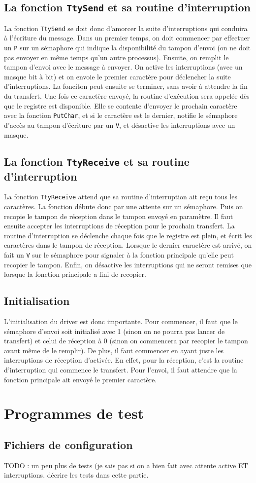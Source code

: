 \documentclass{article}
\def\fun#1{\texttt{#1}}
\begin{document}
\subsection{La fonction \fun{TtySend} et sa routine d'interruption}
La fonction \fun{TtySend} se doit donc d'amorcer la suite d'interruptions qui conduira à l'écriture du message. Dans un premier temps, on doit commencer par effectuer un \fun{P} sur un sémaphore qui indique la disponibilité du tampon d'envoi (on ne doit pas envoyer en même temps qu'un autre processus). Ensuite, on remplit le tampon d'envoi avec le message à envoyer. On active les interruptions (avec un masque bit à bit) et on envoie le premier caractère pour déclencher la suite d'interruptions. La fonciton peut ensuite se terminer, sans avoir à attendre la fin du transfert. Une fois ce caractère envoyé, la routine d'exécution sera appelée dès que le registre est disponible. Elle se contente d'envoyer le prochain caractère avec la fonction \fun{PutChar}, et si le caractère est le dernier, notifie le sémaphore d'accès au tampon d'écriture par un  \fun{V}, et désactive les interruptions avec un masque. 

\subsection{La fonction \fun{TtyReceive} et sa routine d'interruption}
La fonction \fun{TtyReceive} attend que sa routine d'interruption ait reçu tous les caractères. La fonction débute donc par une attente sur un sémaphore. Puis on recopie le tampon de réception dans le tampon envoyé en paramètre. Il faut ensuite accepter les interruptions de réception pour le prochain transfert. La routine d'interruption se déclenche chaque fois que le registre est plein, et écrit les caractères dans le tampon de réception. Lorsque le dernier caractère est arrivé, on fait un \fun{V} sur le sémaphore pour signaler à la fonction principale qu'elle peut recopier le tampon. Enfin, on désactive les interruptions qui ne seront remises que lorsque la fonction principale a fini de recopier.

\subsection{Initialisation}
L'initialisation du driver est donc importante. Pour commencer, il faut que le sémaphore d'envoi soit initialisé avec 1 (sinon on ne pourra pas lancer de transfert) et celui de réception à 0 (sinon on commencera par recopier le tampon avant même de le remplir). De plus, il faut commencer en ayant juste les interruptions de réception d'activée. En effet, pour la réception, c'est la routine d'interruption qui commence le transfert. Pour l'envoi, il faut attendre que la fonction principale ait envoyé le premier caractère.

\section{Programmes de test}
\subsection{Fichiers de configuration}

TODO : un peu plus de tests (je sais pas si on a bien fait avec attente active ET interruptions.
décrire les tests dans cette partie.
\end{document}
